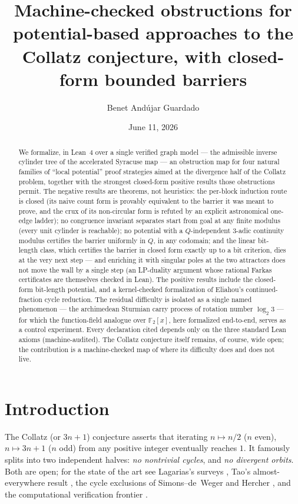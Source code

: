 \documentclass[11pt]{amsart}
\title[Machine-checked obstructions for the Collatz inverse tree]%
{Machine-checked obstructions for potential-based approaches to the
Collatz conjecture, with closed-form bounded barriers}
\author{Benet Andújar Guardado}
\date{June 11, 2026}
\theoremstyle{definition}
\theoremstyle{remark}
\newcommand{\F}{\mathbb{F}}
\begin{document}
\begin{abstract}
We formalize, in Lean~4 over a single verified graph model --- the admissible
inverse cylinder tree of the accelerated Syracuse map --- an obstruction map
for four natural families of ``local potential'' proof strategies aimed at
the divergence half of the Collatz problem, together with the strongest
closed-form positive results those obstructions permit.  The negative results
are theorems, not heuristics: the per-block induction route is closed (its
naive count form is provably equivalent to the barrier it was meant to
prove, and the crux of its non-circular form is refuted by an explicit
astronomical one-edge ladder); no congruence invariant separates start from
goal at any finite modulus (every unit cylinder is reachable); no potential
with a $Q$-independent $3$-adic continuity modulus certifies the barrier
uniformly in $Q$, in any codomain; and the linear bit-length class, which
certifies the barrier in closed form exactly up to a bit criterion, dies at
the very next step --- and enriching it with singular poles at the two
attractors does not move the wall by a single step (an LP-duality argument
whose rational Farkas certificates are themselves checked in Lean).  The
positive results include the closed-form bit-length potential, and a
kernel-checked formalization of Eliahou's continued-fraction cycle reduction.
The residual difficulty is isolated as a single named phenomenon --- the
archimedean Sturmian carry process of rotation number $\log_2 3$ --- for
which the function-field analogue over $\F_2[x]$, here formalized
end-to-end, serves as a control experiment.  Every declaration cited depends
only on the three standard Lean axioms (machine-audited).  The Collatz
conjecture itself remains, of course, wide open; the contribution is a
machine-checked map of where its difficulty does and does not live.
\end{abstract}

\maketitle
\setcounter{tocdepth}{1}
\tableofcontents

\section{Introduction}\label{sec:intro}

The Collatz (or $3n+1$) conjecture asserts that iterating
$n \mapsto n/2$ ($n$ even), $n \mapsto 3n+1$ ($n$ odd) from any positive
integer eventually reaches $1$.  It famously splits into two independent
halves: \emph{no nontrivial cycles}, and \emph{no divergent orbits}.  Both
are open; for the state of the art see Lagarias's surveys
\cite{Lagarias1985,Lagarias2010}, Tao's almost-everywhere result
\cite{Tao2019}, the cycle exclusions of Simons--de~Weger \cite{SimonsDeWeger2005}
and Hercher \cite{Hercher2023}, and the computational verification frontier
\cite{Barina2021,OliveiraESilva2010}.
\end{document}
